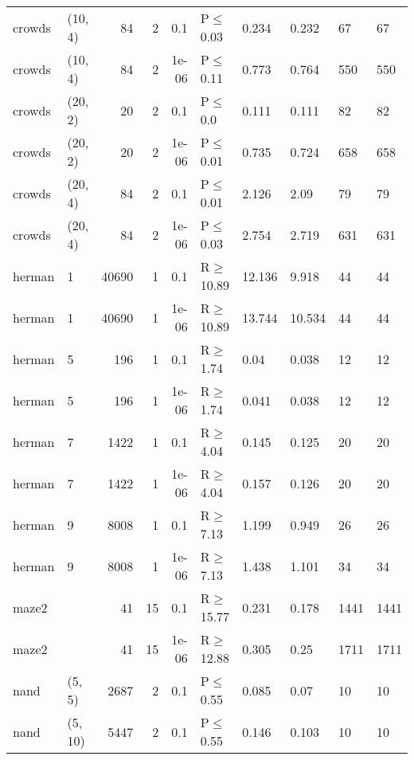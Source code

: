 \begin{longtable}{llrrrlllll}
 crowds        & (10, 4)   &     	84 &   2 & 0.1   & P$\leq$0.03  & 0.234   & 0.232  & 67      & 67      \\
 crowds        & (10, 4)   &     	84 &   2 & 1e-06 & P$\leq$0.11  & 0.773   & 0.764  & 550     & 550     \\
 crowds        & (20, 2)   &     	20 &   2 & 0.1   & P$\leq$0.0   & 0.111   & 0.111  & 82      & 82      \\
 crowds        & (20, 2)   &     	20 &   2 & 1e-06 & P$\leq$0.01  & 0.735   & 0.724  & 658     & 658     \\
 crowds        & (20, 4)   &     	84 &   2 & 0.1   & P$\leq$0.01  & 2.126   & 2.09   & 79      & 79      \\
 crowds        & (20, 4)   &     	84 &   2 & 1e-06 & P$\leq$0.03  & 2.754   & 2.719  & 631     & 631     \\
 herman        & 1         &  	40690 &   1 & 0.1   & R$\geq$10.89 & 12.136  & 9.918  & 44      & 44      \\
 herman        & 1         &  	40690 &   1 & 1e-06 & R$\geq$10.89 & 13.744  & 10.534 & 44      & 44      \\
 herman        & 5         &    	196 &   1 & 0.1   & R$\geq$1.74  & 0.04    & 0.038  & 12      & 12      \\
 herman        & 5         &    	196 &   1 & 1e-06 & R$\geq$1.74  & 0.041   & 0.038  & 12      & 12      \\
 herman        & 7         &   	1422 &   1 & 0.1   & R$\geq$4.04  & 0.145   & 0.125  & 20      & 20      \\
 herman        & 7         &   	1422 &   1 & 1e-06 & R$\geq$4.04  & 0.157   & 0.126  & 20      & 20      \\
 herman        & 9         &   	8008 &   1 & 0.1   & R$\geq$7.13  & 1.199   & 0.949  & 26      & 26      \\
 herman        & 9         &   	8008 &   1 & 1e-06 & R$\geq$7.13  & 1.438   & 1.101  & 34      & 34      \\
 maze2         &           &     	41 &  15 & 0.1   & R$\geq$15.77 & 0.231   & 0.178  & 1441    & 1441    \\
 maze2         &           &     	41 &  15 & 1e-06 & R$\geq$12.88 & 0.305   & 0.25   & 1711    & 1711    \\
 nand          & (5, 5)    &   	2687 &   2 & 0.1   & P$\leq$0.55  & 0.085   & 0.07   & 10      & 10      \\
 nand          & (5, 10)   &   	5447 &   2 & 0.1   & P$\leq$0.55  & 0.146   & 0.103  & 10      & 10      \\

\end{longtable}
